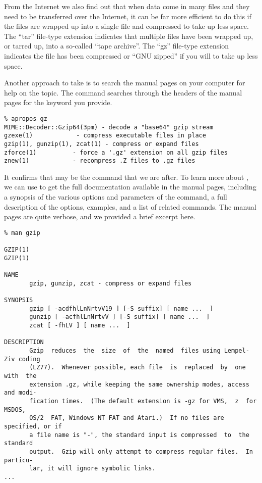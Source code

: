 From the Internet we also find out that when data come in many files and they need to be transferred over the
Internet, it can be far more efficient to do this if the files are
wrapped up into a single file and compressed to take up less
space. The ``tar'' file-type extension indicates that multiple files 
have been wrapped up, or tarred up, into a so-called ``tape archive''.
The  ``gz'' file-type extension indicates the file has been compressed
or ``GNU zipped'' if you will to take up less space.  


Another approach to take is to search the manual pages on your computer for
help on the topic.  The  command searches through the
headers of the manual pages for the keyword you provide. 
{\footnotesize{
\begin{verbatim}
% apropos gz
MIME::Decoder::Gzip64(3pm) - decode a "base64" gzip stream
gzexe(1)            - compress executable files in place
gzip(1), gunzip(1), zcat(1) - compress or expand files
zforce(1)          - force a '.gz' extension on all gzip files
znew(1)            - recompress .Z files to .gz files
\end{verbatim}
}}
It confirms that  may be the command that we are
after.  To learn more about , we can use 
to get the full documentation available in the manual pages, including
a synopsis of the various options and parameters of the command, a
full description of the options, examples, and a list of related
commands. The manual pages are quite verbose, and we provided a brief
excerpt here.
{\footnotesize{
\begin{verbatim}
% man gzip

GZIP(1)                                                                GZIP(1)

NAME
       gzip, gunzip, zcat - compress or expand files

SYNOPSIS
       gzip [ -acdfhlLnNrtvV19 ] [-S suffix] [ name ...  ]
       gunzip [ -acfhlLnNrtvV ] [-S suffix] [ name ...  ]
       zcat [ -fhLV ] [ name ...  ]

DESCRIPTION
       Gzip  reduces  the  size  of  the  named  files using Lempel-Ziv coding
       (LZ77).  Whenever possible, each file  is  replaced  by  one  with  the
       extension .gz, while keeping the same ownership modes, access and modi-
       fication times.  (The default extension is -gz for VMS,  z  for  MSDOS,
       OS/2  FAT, Windows NT FAT and Atari.)  If no files are specified, or if
       a file name is "-", the standard input is compressed  to  the  standard
       output.  Gzip will only attempt to compress regular files.  In particu-
       lar, it will ignore symbolic links.
...
\end{verbatim} 
}}

